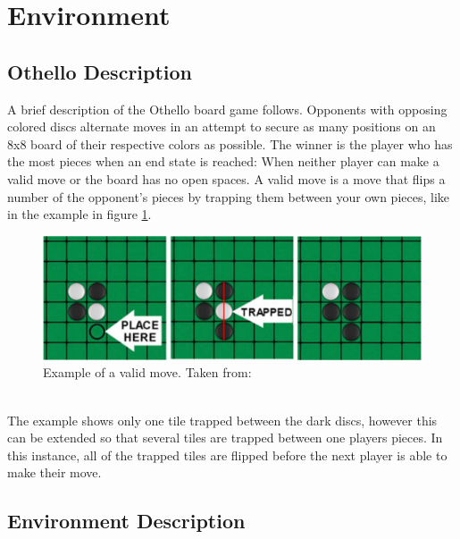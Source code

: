 \documentclass{article}
\begin{document}
\section{\label{doc:env}Environment}
\subsection{Othello Description}
A brief description of the Othello board game follows. Opponents with opposing colored discs alternate moves in an attempt to secure as many positions on an 8x8 board of their respective colors as possible. The winner is the player who has the most pieces when an end state is reached: When neither player can make a valid move or the board has no open spaces. A valid move is a move that flips a number of the opponent’s pieces by trapping them between your own pieces, like in the example in figure \ref{fig:valid_move}. 
\begin{figure}[ht] %
\centering
\includegraphics[width=0.75\linewidth]{valid_move.png}
\caption{\label{fig:valid_move}Example of a valid move. Taken from: \cite{picture}}
\end{figure}
\\The example shows only one tile trapped between the dark discs, however this can be extended so that several tiles are trapped between one players pieces. In this instance, all of the trapped tiles are flipped before the next player is able to make their move.

\subsection{\label{doc:env_desc}Environment Description}
\end{document}

